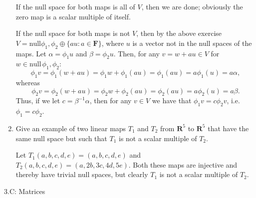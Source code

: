 \documentclass{book}
\begin{document}
\begin{enumerate}
If the null space for both maps is all of \(V\), then we are done; obviously the zero map is a scalar multiple of itself.

If the null space for both maps is not \(V\), then by the above exercise \(V=\textrm{null}\phi_1,\phi_2 \oplus \{au:a \in \textbf{F}\}\), where \(u\) is a vector not in the null spaces of the maps.  Let \(\alpha=\phi_1u\) and \(\beta=\phi_2u\).  Then, for any \(v=w+au \in V\) for \(w \in \textrm{null} \, \phi_1,\phi_2\):
\[\phi_1v=\phi_1(w+au)=\phi_1w+\phi_1(au)=\phi_1(au)=a\phi_1(u)=a\alpha,\] whereas \[\phi_2v=\phi_2(w+au)=\phi_2w+\phi_2(au)=\phi_2(au)=a\phi_2(u)=a\beta.\]
Thus, if we let \(c=\beta^{-1}\alpha\), then for any \(v \in V\) we have that \(\phi_1v=c\phi_2v\), i.e. \(\phi_1=c\phi_2\).

\item Give an example of two linear maps \(T_1\) and \(T_2\) from \(\textbf{R}^5\) to \(\textbf{R}^5\) that have the same null space but such that \(T_1\) is not a scalar multiple of \(T_2\).

Let \(T_1(a,b,c,d,e)=(a,b,c,d,e)\) and \(T_2(a,b,c,d,e)=(a,2b,3c,4d,5e)\).  Both these maps are injective and thereby have trivial null spaces, but clearly \(T_1\) is not a scalar multiple of \(T_2\).

\end{enumerate}

3.C: Matrices
\end{document}
